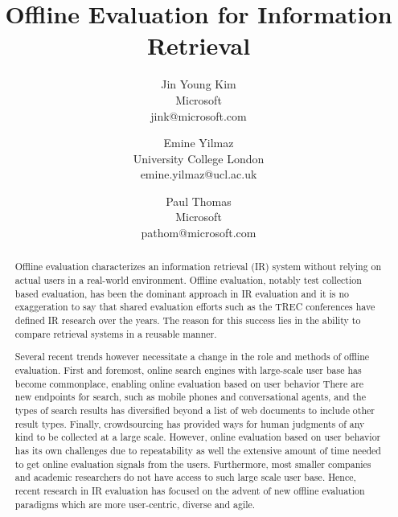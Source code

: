 \documentclass[openany]{now} %
\title{Offline Evaluation for Information Retrieval}
\author{
	Jin Young Kim \\
	Microsoft \\
	jink@microsoft.com
	\and
	Emine Yilmaz \\
	University College London \\
	emine.yilmaz@ucl.ac.uk
	\and
	Paul Thomas \\
	Microsoft \\
	pathom@microsoft.com
}
\newcommand{\authornote}[3]{\marginpar{\footnotesize\color{#1}#2: #3}{\color{#1}{$\star$}}}
\newcommand{\jin}[1]{\authornote{red}{Jin}{#1}}
\newcommand{\paul}[1]{\authornote{blue}{Paul}{#1}}
\begin{document}

\frontmatter  %

\maketitle

\tableofcontents

\mainmatter

\begin{abstract}
Offline evaluation characterizes an information retrieval (IR) system without relying on actual users in a real-world environment. 
Offline evaluation, notably test collection based evaluation, has been the dominant approach in IR evaluation and it is no exaggeration to say that shared evaluation efforts such as the TREC conferences have defined IR research over the years. 
The reason for this success lies in the ability to compare retrieval systems in a reusable manner.


Several recent trends however necessitate a change in the role and methods of offline evaluation. 
First and foremost, online search engines with large-scale user base has become commonplace, enabling online evaluation based on user behavior There are new endpoints for search, such as mobile phones and conversational agents, and the types of search results has diversified beyond a list of web documents to include other result types. 
Finally, crowdsourcing has provided ways for human judgments of any kind to be collected at a large scale. 
However, online evaluation based on user behavior has its own challenges due to repeatability as well the extensive amount of time needed to get online evaluation signals from the users. 
Furthermore, most smaller companies and academic researchers do not have access to such large scale user base. 
Hence, recent research in IR evaluation has focused on the advent of new  offline evaluation paradigms which are more user-centric, diverse and agile.


\end{abstract}
\end{document}
